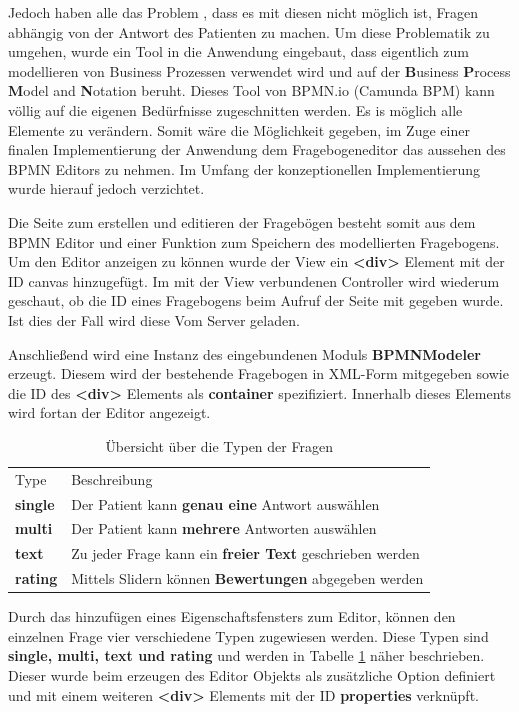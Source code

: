 Jedoch haben alle das Problem , dass es mit diesen nicht möglich ist, Fragen abhängig von der Antwort des Patienten zu machen. Um diese Problematik zu umgehen, wurde ein Tool in die Anwendung eingebaut, dass eigentlich zum modellieren von Business Prozessen verwendet wird und auf der \textbf{B}usiness \textbf{P}rocess \textbf{M}odel and \textbf{N}otation beruht. Dieses Tool von BPMN.io (Camunda BPM) kann völlig auf die eigenen Bedürfnisse zugeschnitten werden. Es is möglich alle Elemente zu verändern. Somit wäre die Möglichkeit gegeben, im Zuge einer finalen Implementierung der Anwendung dem Fragebogeneditor das aussehen des BPMN Editors zu nehmen. Im Umfang der konzeptionellen Implementierung wurde hierauf jedoch verzichtet.

Die Seite zum erstellen und editieren der Fragebögen besteht somit aus dem BPMN Editor und einer Funktion zum Speichern des modellierten Fragebogens. Um den Editor anzeigen zu können wurde der View ein \textbf{<div>} Element mit der ID canvas hinzugefügt. Im mit der View verbundenen Controller wird wiederum geschaut, ob die ID eines Fragebogens beim Aufruf der Seite mit gegeben wurde. Ist dies der Fall wird diese Vom Server geladen.

Anschließend wird eine Instanz des eingebundenen Moduls \textbf{BPMNModeler} erzeugt. Diesem wird der bestehende Fragebogen in XML-Form mitgegeben sowie die ID des \textbf{<div>} Elements als \textbf{container} spezifiziert. Innerhalb dieses Elements wird fortan der Editor angezeigt.

\begin{table}[H]
	\centering
	\begin{tabular}{l|l}
		\rowcolor{blue!10} Type &  Beschreibung \\\cline{1-2}
		\textbf{single}		& Der Patient kann \textbf{genau eine} Antwort auswählen  \\
		\textbf{multi}		& Der Patient kann \textbf{mehrere} Antworten auswählen   \\
		\textbf{text}		& Zu jeder Frage kann ein \textbf{freier Text} geschrieben werden  \\
		\textbf{rating}		& Mittels Slidern können \textbf{Bewertungen} abgegeben werden                                    
	\end{tabular}
	\caption{Übersicht über die Typen der Fragen}
	\label{FrageTypen}
\end{table}

Durch das hinzufügen eines Eigenschaftsfensters zum Editor, können den einzelnen Frage vier verschiedene Typen zugewiesen werden. Diese Typen sind \textbf{single, multi, text und rating} und werden in Tabelle \ref{FrageTypen} näher beschrieben. Dieser wurde beim erzeugen des Editor Objekts als zusätzliche Option definiert und mit einem weiteren \textbf{<div>} Elements mit der ID \textbf{properties} verknüpft.

